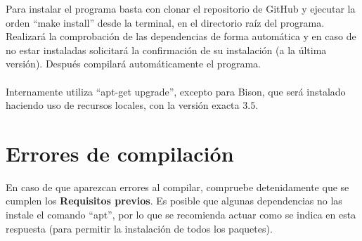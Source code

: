 Para instalar el programa basta con clonar el repositorio de GitHub \cite{Programa} y ejecutar la orden ``make install'' desde la terminal, en el directorio raíz del programa. Realizará la comprobación de las dependencias de forma automática y en caso de no estar instaladas solicitará la confirmación de su instalación (a la última versión). Después compilará automáticamente el programa.\\
\\ Internamente utiliza  ``apt-get upgrade'', excepto para Bison, que será instalado haciendo uso de recursos locales, con la versión exacta $3.5$.

\section{Errores de compilación}

En caso de que aparezcan errores al compilar, compruebe detenidamente que se cumplen los \textbf{Requisitos previos}. Es posible que algunas dependencias no las instale el comando ``apt'', por lo que se recomienda actuar como se indica en esta respuesta \cite{AptErrors} (para permitir la instalación de todos los paquetes).

\endinput
